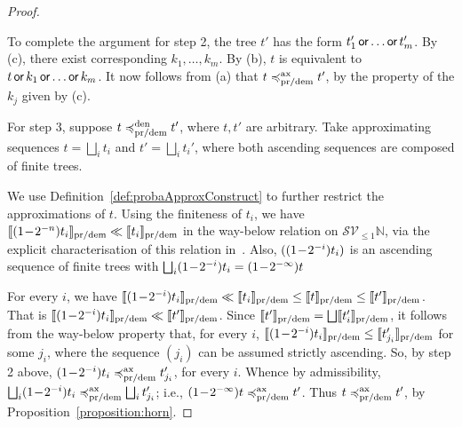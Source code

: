 \begin{proof}
\begin{enumerate}[(a)]
  
      \end{enumerate}
To complete the argument for step 2, the  tree $t'$ has the form $t'_1 \orEff \dots \orEff t'_m$. By (c), there exist corresponding  $k_1, \dots, k_m$. By (b), $t$ is equivalent to
$t \orEff k_1 \orEff \dots \orEff k_m$. It now follows from (a) that $t \Basicleq^\Ax_\prdem t'$,
by the property of the $k_j$ given by (c).


For step 3, suppose 
$t \Basicleq^\Den_\prdem t'$, where $t,t'$ are arbitrary.
Take approximating sequences  $t = \bigsqcup_i t_i$ and $t' = \bigsqcup_i t_i'$,
    where both ascending sequences are composed of {finite} trees.

We use Definition~\ref{def:probaApproxConstruct} to further restrict the approximations of $t$.
Using the finiteness of $t_i$,
we have $\Sem{\Iter{t_i}{n}}_\prdem \ll \Sem{t_i}_\prdem$ in the way-below relation 
on $\mathcal{S}\mathcal{V}_{\leq 1} \mathbb{N}$, via the explicit characterisation of this relation in~\cite{KeimelP2016}. Also, $(\Iter{t_i}{i})$ is an ascending sequence 
of finite trees with $\bigsqcup_i \Iter{t_i}{i} = \Iter{t}{\infty}$

For every $i$, we have 
$\Sem{\Iter{t_i}{i}}_\prdem \ll  \Sem{t_i}_\prdem \leq \Sem{t}_\prdem \leq \Sem{t'}_\prdem$. That is $\Sem{\Iter{t_i}{i}}_\prdem \ll  \Sem{t'}_\prdem$. 
Since $\Sem{t'}_\prdem = \bigsqcup \Sem{t_i'}_\prdem$, it follows from the way-below property that, for every $i$, 
$\Sem{\Iter{t_i}{i}}_\prdem \leq \Sem{t'_{j_i}}_\prdem$ for some $j_i$, where the sequence
 $(j_i)$ can be assumed strictly ascending.
So, by step 2 above, 
$\Iter{t_i}{i} \Basicleq^\Ax_\prdem t'_{j_i}$, for every $i$.
Whence by admissibility, 
$\bigsqcup_i \Iter{t_i}{i} \Basicleq^\Ax_\prdem  \bigsqcup_i t'_{j_i}$; i.e.,
$\Iter{t}{\infty}  \Basicleq^\Ax_\prdem  t'$. 
Thus $t \Basicleq^\Ax_\prdem  t'$, by Proposition~\ref{proposition:horn}.
 \end{proof}

